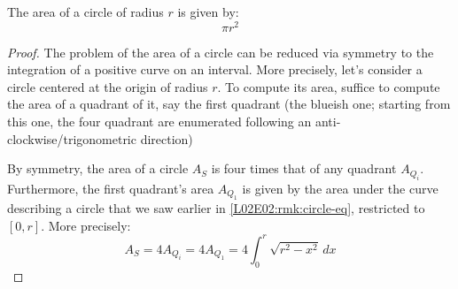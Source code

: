 \documentclass[solutions.tex]{subfiles}
\begin{document}
\begin{theorem} The area of a circle of radius $r$ is given by:
\[ \boxed{\pi r^2} \]
\end{theorem}
\begin{proof}
The problem of the area of a circle can be reduced via
symmetry to the integration of a positive curve on an interval.
More precisely, let's consider a circle centered at the origin
of radius $r$. To compute its area, suffice to compute the area of
a quadrant of it, say the first quadrant (the blueish one; starting
from this one, the four quadrant are enumerated following an
anti-clockwise/trigonometric direction)

\begin{figure}[H]
	\centering
\end{figure}

By symmetry, the area of a circle $A_S$ is four times that of
any quadrant $A_{Q_i}$. Furthermore, the first quadrant's area $A_{Q_1}$
is given by the area under the curve describing a circle
that we saw earlier in \ref{L02E02:rmk:circle-eq}, restricted
to $[0, r]$. More precisely:
\[
	A_S = 4 A_{Q_i} = 4 A_{Q_1} = 4\int_0^r\sqrt{r^2 - x^2}\,dx
\]


\end{proof}
\end{document}
